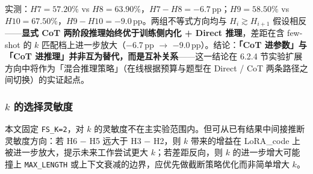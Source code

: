 实测：$H7=57.20\%$ vs $H8=63.90\%$，$H7-H8=-6.7$\,pp；$H9=58.50\%$ vs $H10=67.50\%$，$H9-H10=-9.0$\,pp。两组不等式方向均与 $H_i \gtrsim H_{i+1}$ 假设相反——\textbf{显式 CoT 两阶段推理始终优于训练侧内化 + Direct 推理}，差距在含 few-shot 的 $k$ 匹配档上进一步放大（−6.7\,pp $\to$ −9.0\,pp）。结论：\textbf{「CoT 进参数」与「CoT 进推理」并非互为替代，而是互补关系}——这一结论在 6.2.4 节实验扩展方向中将作为「混合推理策略」（在线根据预算与题型在 Direct / CoT 两条路径之间切换）的实证起点。

\subsubsection{$k$ 的选择灵敏度}
本文固定 \texttt{FS\_K=2}，对 $k$ 的灵敏度不在主实验范围内。但可从已有结果中间接推断灵敏度方向：若 H6 − H5 远大于 H3 − H2，则 $k$ 带来的增益在 LoRA\_code 上被进一步放大，提示未来工作尝试更大 $k$；若差距反向，则 $k$ 的进一步增大可能撞上 \texttt{MAX\_LENGTH} 或上下文衰减的边界，应优先做截断策略优化而非简单增大 $k$。